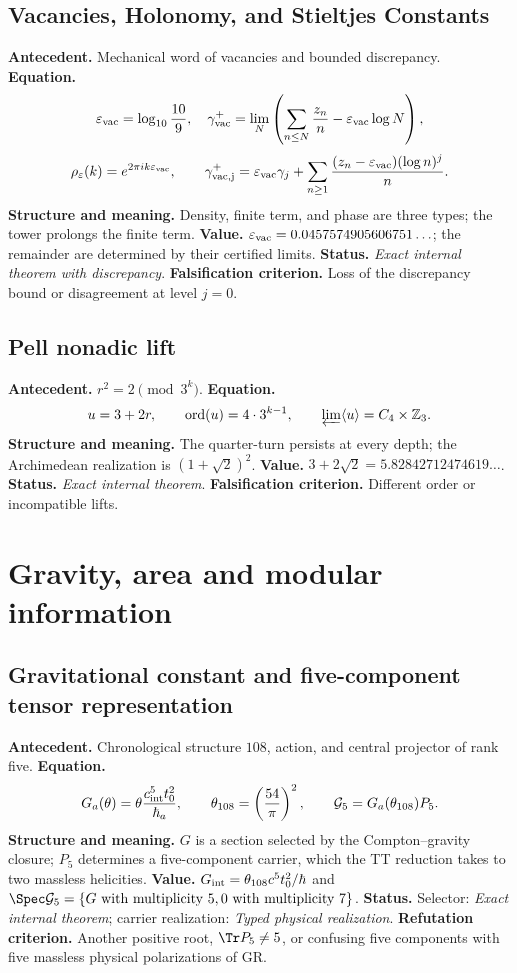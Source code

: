 \subsection*{Vacancies, Holonomy, and Stieltjes Constants }
\textbf{Antecedent.} Mechanical word of vacancies and bounded discrepancy.
\textbf{Equation.}
\[
\varepsilon_{\rm vac}=\log_{10}\frac{10}{9},\quad
\gamma_{\rm vac}^+=\lim_N\left(\sum_{n\le N}\frac{z_n}{n}
-\varepsilon_{\rm vac}\log N\right),
\]
\[
\rho_\varepsilon(k)=e^{2\pi ik\varepsilon_{\rm vac}},\qquad
\gamma_{\rm vac,j}^+=\varepsilon_{\rm vac}\gamma_j+
\sum_{n\ge1}\frac{(z_n-\varepsilon_{\rm vac})(\log n)^j}{n}.
\]
\textbf{Structure and meaning.} Density, finite term, and phase are three
types; the tower prolongs the finite term. \textbf{Value.}
\(\varepsilon_{\rm vac}=0.0457574905606751\ldots\); the remainder are determined
by their certified limits. \textbf{Status.} \emph{Exact internal theorem with
discrepancy}. \textbf{Falsification criterion.} Loss of the discrepancy bound or
disagreement at level \(j=0\).

\subsection*{Pell nonadic lift }
\textbf{Antecedent.} \(r^2=2\pmod{3^k}\). \textbf{Equation.}
\[
u=3+2r,\qquad \operatorname{ord}(u)=4\cdot3^{k-1},
\qquad \varprojlim\langle u\rangle=C_4\times\mathbb Z_3.
\]
\textbf{Structure and meaning.} The quarter-turn persists at every
depth; the Archimedean realization is \((1+\sqrt2)^2\).
\textbf{Value.} \(3+2\sqrt2=5.82842712474619\ldots\).
\textbf{Status.} \emph{Exact internal theorem}. \textbf{Falsification criterion.} Different order
or incompatible lifts.

\section{Gravity, area and modular information}

\subsection*{Gravitational constant and five-component tensor representation }
\textbf{Antecedent.} Chronological structure \(108\), action, and central
projector of rank
five. \textbf{Equation.}
\[
G_a(\theta)=\theta\frac{c_{\rm int}^5t_0^2}{\hbar_a},
\qquad \theta_{108}=\left(\frac{54}{\pi}\right)^2,
\qquad \mathcal G_5=G_a(\theta_{108})P_5.
\]
\textbf{Structure and meaning.} \(G\) is a section selected by the
Compton--gravity closure; \(P_5\) determines a five-component carrier,
which the TT reduction takes to two massless helicities.
\textbf{Value.} \(G_{\rm int}=\theta_{108}c^5t_0^2/\hbar\) and
\(\Spec\mathcal G_5=\{G\text{ with multiplicity }5,
0\text{ with multiplicity }7\}\).
\textbf{Status.} Selector: \emph{Exact internal theorem}; carrier realization:
\emph{Typed physical realization}. \textbf{Refutation criterion.} Another positive root,
\(\Tr P_5\ne5\), or confusing five components with five massless physical
polarizations of GR.

